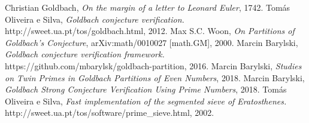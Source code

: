 \documentclass[10pt,twocolumn]{article}
\begin{document}
\begin{thebibliography}{9}

  Christian Goldbach, 
  \emph{On the margin of a letter to Leonard Euler},
  1742.
  Tomás Oliveira e Silva,
  \emph{Goldbach conjecture verification.}
  http://sweet.ua.pt/tos/goldbach.html,
  2012.
  Max S.C. Woon,
  \emph{On Partitions of Goldbach's Conjecture}, arXiv:math/0010027 [math.GM], 2000.  
  Marcin Barylski,
  \emph{Goldbach conjecture verification framework.}
  https://github.com/mbarylsk/goldbach-partition,
  2016.
  Marcin Barylski,
   \emph{Studies on Twin Primes in Goldbach Partitions of Even Numbers}, 2018.
  Marcin Barylski,
   \emph{Goldbach Strong Conjecture Verification Using Prime Numbers}, 2018.
  Tomás Oliveira e Silva,
  \emph{Fast implementation of the segmented sieve of Eratosthenes.}
  http://sweet.ua.pt/tos/software/prime\_sieve.html,
  2002.
\end{thebibliography}
\end{document}
